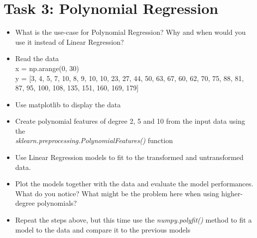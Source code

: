 \documentclass{article}
\begin{document}
\section*{Task 3: Polynomial Regression}

\begin{itemize}
    \item What is the use-case for Polynomial Regression? Why and when would you use it instead of Linear Regression?
    \item Read the data \\
    x = np.arange(0, 30) \\
    y = [3, 4, 5, 7, 10, 8, 9, 10, 10, 23, 27, 44, 50, 63, 67, 60, 62, 70, 75, 88, 81, 87, 95, 100, 108, 135, 151, 160, 169, 179]
    \item Use matplotlib to display the data
    \item Create polynomial features of degree 2, 5 and 10 from the input data using the\\ \emph{sklearn.preprocessing.PolynomialFeatures()} function
    \item Use Linear Regression models to fit to the transformed and untransformed data. 
    \item Plot the models together with the data and evaluate the model performances. What do you notice? What might be the problem here when using higher-degree polynomials?
    \item Repeat the steps above, but this time use the \emph{numpy.polyfit()} method to fit a model to the data and compare it to the previous models
\end{itemize}

%
%
\end{document}
